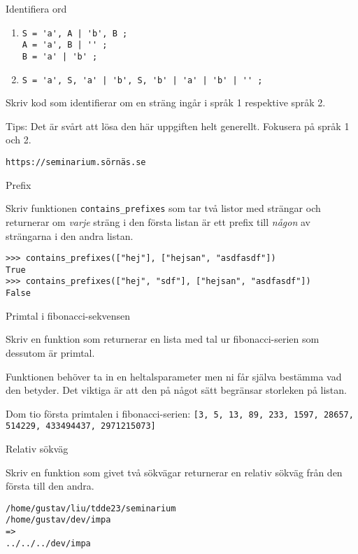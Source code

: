 \documentclass{beamer}
\begin{document}
  \begin{frame}[fragile]{Identifiera ord}

    \begin{enumerate}
      \item \begin{Verbatim}
S = 'a', A | 'b', B ;
A = 'a', B | '' ;
B = 'a' | 'b' ;
      \end{Verbatim}
      \item \begin{Verbatim}
S = 'a', S, 'a' | 'b', S, 'b' | 'a' | 'b' | '' ;
      \end{Verbatim}
    \end{enumerate}

    Skriv kod som identifierar om en sträng ingår i språk 1 respektive språk 2.

    Tips: Det är svårt att lösa den här uppgiften helt generellt. Fokusera på språk 1 och 2.

    \texttt{https://seminarium.sörnäs.se}

  \end{frame}

  \begin{frame}[fragile]{Prefix}

    Skriv funktionen \texttt{contains\_prefixes} som tar två listor med strängar
    och returnerar om \emph{varje} sträng i den första listan är ett prefix till
    \emph{någon} av strängarna i den andra listan.

    \begin{lstlisting}
>>> contains_prefixes(["hej"], ["hejsan", "asdfasdf"])
True
>>> contains_prefixes(["hej", "sdf"], ["hejsan", "asdfasdf"])
False
    \end{lstlisting}

  \end{frame}

  \begin{frame}{Primtal i fibonacci-sekvensen}

    Skriv en funktion som returnerar en lista med tal ur fibonacci-serien som
    dessutom är primtal.

    Funktionen behöver ta in en heltalsparameter men ni får själva bestämma vad
    den betyder. Det viktiga är att den på något sätt begränsar storleken på
    listan.

    Dom tio första primtalen i fibonacci-serien:
    \texttt{[3, 5, 13, 89, 233, 1597, 28657, 514229, 433494437, 2971215073]}

  \end{frame}

  \begin{frame}[fragile]{Relativ sökväg}

    Skriv en funktion som givet två sökvägar returnerar en relativ sökväg från
    den första till den andra.

    \begin{lstlisting}
/home/gustav/liu/tdde23/seminarium
/home/gustav/dev/impa
=>
../../../dev/impa
    \end{lstlisting}

  \end{frame}
\end{document}
